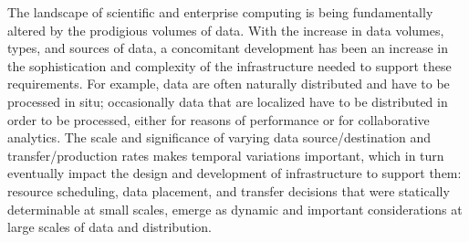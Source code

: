 The landscape of scientific and enterprise computing is being fundamentally
altered by the prodigious volumes of data.  %
With the increase in data volumes, types, and sources of data, a concomitant
development has been an increase in the sophistication and complexity of the
infrastructure needed to support these requirements. For example, data are often
naturally distributed and have to be processed in situ; occasionally data that
are localized have to be distributed in order to be processed, either for
reasons of performance or for collaborative analytics.  The scale and
significance of varying data source/destination and transfer/production rates
makes temporal variations important, which in turn eventually impact the design
and development of infrastructure to support them: resource scheduling, data
placement, and transfer decisions that were statically determinable at small
scales, emerge as dynamic and important considerations at large scales of data
and distribution.








